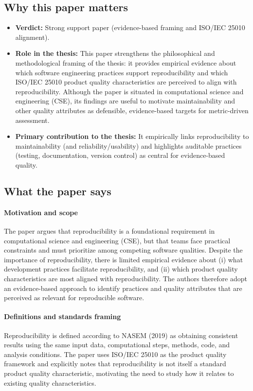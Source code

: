 \documentclass[11pt,a4paper]{article}
\begin{document}
\subsection{Why this paper matters}
\begin{itemize}[leftmargin=*]
  \item \textbf{Verdict:} Strong support paper (evidence-based framing and ISO/IEC 25010 alignment).
  \item \textbf{Role in the thesis:} This paper strengthens the philosophical and methodological framing of the thesis: it provides empirical evidence about which software engineering practices support reproducibility and which ISO/IEC 25010 product quality characteristics are perceived to align with reproducibility. Although the paper is situated in computational science and engineering (CSE), its findings are useful to motivate maintainability and other quality attributes as defensible, evidence-based targets for metric-driven assessment.
  \item \textbf{Primary contribution to the thesis:} It empirically links reproducibility to maintainability (and reliability/usability) and highlights auditable practices (testing, documentation, version control) as central for evidence-based quality.
\end{itemize}

\subsection{What the paper says}
\paragraph{Motivation and scope}
The paper argues that reproducibility is a foundational requirement in computational science and engineering (CSE), but that teams face practical constraints and must prioritize among competing software qualities. Despite the importance of reproducibility, there is limited empirical evidence about (i) what development practices facilitate reproducibility, and (ii) which product quality characteristics are most aligned with reproducibility. The authors therefore adopt an evidence-based approach to identify practices and quality attributes that are perceived as relevant for reproducible software.

\paragraph{Definitions and standards framing}
Reproducibility is defined according to NASEM (2019) as obtaining consistent results using the same input data, computational steps, methods, code, and analysis conditions. The paper uses ISO/IEC 25010 as the product quality framework and explicitly notes that reproducibility is not itself a standard product quality characteristic, motivating the need to study how it relates to existing quality characteristics.
\end{document}
